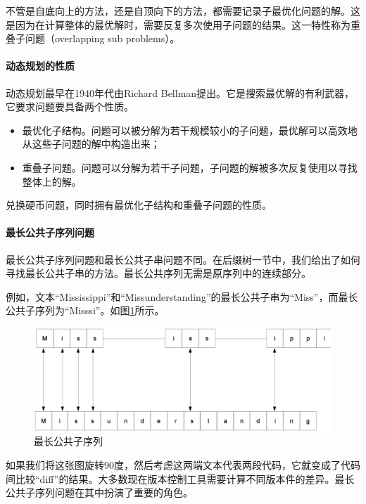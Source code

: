 \documentclass[UTF8]{article}
\begin{document}
不管是自底向上的方法，还是自顶向下的方法，都需要记录子最优化问题的解。这是因为在计算整体的最优解时，需要反复多次使用子问题的结果。这一特性称为重叠子问题（overlapping sub problems）。

\paragraph{动态规划的性质}

动态规划最早在1940年代由Richard Bellman提出。它是搜索最优解的有利武器，它要求问题要具备两个性质。

\begin{itemize}
\item 最优化子结构。问题可以被分解为若干规模较小的子问题，最优解可以高效地从这些子问题的解中构造出来；
\item 重叠子问题。问题可以分解为若干子问题，子问题的解被多次反复使用以寻找整体上的解。
\end{itemize}

兑换硬币问题，同时拥有最优化子结构和重叠子问题的性质。

\paragraph{最长公共子序列问题}
 

最长公共子序列问题和最长公共子串问题不同。在后缀树一节中，我们给出了如何寻找最长公共子串的方法。最长公共序列无需是原序列中的连续部分。

例如，文本“Mississippi”和“Missunderstanding”的最长公共子串为“Miss”，而最长公共子序列为“Misssi”。如图\ref{fig:lcs}所示。

\begin{figure}[htbp]
 \centering
 \includegraphics[scale=0.3]{img/lcs.eps}
 \caption{最长公共子序列}
 \label{fig:lcs}
\end{figure}

如果我们将这张图旋转90度，然后考虑这两端文本代表两段代码，它就变成了代码间比较“diff”的结果。大多数现在版本控制工具需要计算不同版本件的差异。最长公共子序列问题在其中扮演了重要的角色。
\end{document}
